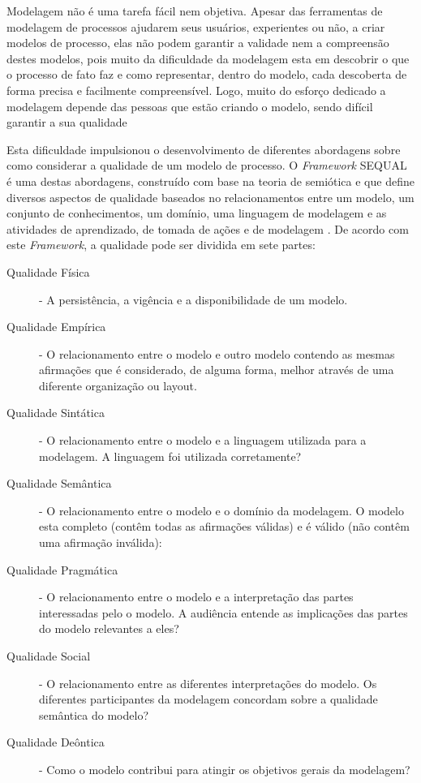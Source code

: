 \documentclass[12pt]{article}
\begin{document}
Modelagem não é uma tarefa fácil nem objetiva. Apesar das ferramentas de modelagem de processos ajudarem seus usuários, experientes ou não, a criar modelos de processo, elas não podem garantir a validade nem a compreensão destes modelos, pois muito da dificuldade da modelagem esta em descobrir o que o processo de fato faz e como representar, dentro do modelo, cada descoberta de forma precisa e facilmente compreensível. Logo, muito do esforço dedicado a modelagem depende das pessoas que estão criando o modelo, sendo difícil garantir a sua qualidade \cite{Mendling2008}

Esta dificuldade impulsionou o desenvolvimento de diferentes abordagens sobre como considerar a qualidade de um modelo de processo. O \textit{Framework} SEQUAL \cite{Krogstie2006,Lindland1994} é uma destas abordagens, construído com base na teoria de semiótica e que define diversos aspectos de qualidade baseados no relacionamentos entre um modelo, um conjunto de conhecimentos, um domínio, uma linguagem de modelagem e as atividades de aprendizado, de tomada de ações e de modelagem \cite{Mendling2007}. De acordo com este \textit{Framework}, a qualidade pode ser dividida em sete partes:

\begin{description}
	\item [Qualidade Física] - A persistência, a vigência e a disponibilidade de um modelo.
	\item [Qualidade Empírica] - O relacionamento entre o modelo e outro modelo contendo as mesmas afirmações que é considerado, de alguma forma, melhor através de uma diferente organização ou layout.
	\item [Qualidade Sintática] - O relacionamento entre o modelo e a linguagem utilizada para a modelagem. A linguagem foi utilizada corretamente?
	\item [Qualidade Semântica] - O relacionamento entre o modelo e o domínio da modelagem. O modelo esta completo (contêm todas as afirmações válidas) e é válido (não contêm uma afirmação inválida):
	\item [Qualidade Pragmática] - O relacionamento entre o modelo e a interpretação das partes interessadas pelo o modelo. A audiência entende as implicações das partes do modelo relevantes a eles?
	\item [Qualidade Social] - O relacionamento entre as diferentes interpretações do modelo. Os diferentes participantes da modelagem concordam sobre a qualidade semântica do modelo?
	\item [Qualidade Deôntica] - Como o modelo contribui para atingir os objetivos gerais da modelagem?
\end{description}
\end{document}
